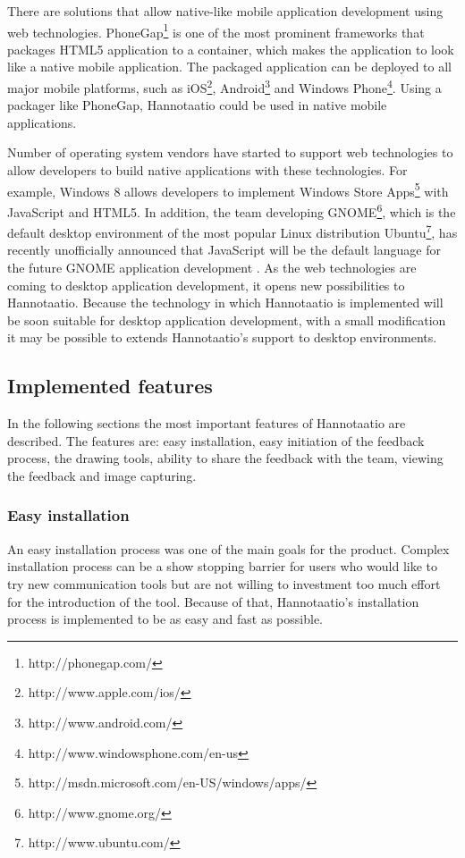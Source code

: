 \documentclass[english,12pt,a4paper,pdftex]{article}
\begin{document}
There are solutions that allow native-like mobile application development using web technologies. PhoneGap\footnote{http://phonegap.com/} is one of the most prominent frameworks that packages HTML5 application to a container, which makes the application to look like a native mobile application. The packaged application can be deployed to all major mobile platforms, such as iOS\footnote{http://www.apple.com/ios/}, Android\footnote{http://www.android.com/} and Windows Phone\footnote{http://www.windowsphone.com/en-us}. Using a packager like PhoneGap, Hannotaatio could be used in native mobile applications.

Number of operating system vendors have started to support web technologies to allow developers to build native applications with these technologies. For example, Windows 8 allows developers to implement Windows Store Apps\footnote{http://msdn.microsoft.com/en-US/windows/apps/} with JavaScript and HTML5. In addition, the team developing GNOME\footnote{http://www.gnome.org/}, which is the default desktop environment of the most popular Linux distribution Ubuntu\footnote{http://www.ubuntu.com/}, has recently unofficially announced that JavaScript will be the default language for the future GNOME application development \citep{treitter2013}. As the web technologies are coming to desktop application development, it opens new possibilities to Hannotaatio. Because the technology in which Hannotaatio is implemented will be soon suitable for desktop application development, with a small modification it may be possible to extends Hannotaatio's support to desktop environments.

\subsection{Implemented features}

In the following sections the most important features of Hannotaatio are described. The features are: easy installation, easy initiation of the feedback process, the drawing tools, ability to share the feedback with the team, viewing the feedback and image capturing.

\subsubsection{Easy installation}

An easy installation process was one of the main goals for the product. Complex installation process can be a show stopping barrier for users who would like to try new communication tools but are not willing to investment too much effort for the introduction of the tool. Because of that, Hannotaatio's installation process is implemented to be as easy and fast as possible.
\end{document}
